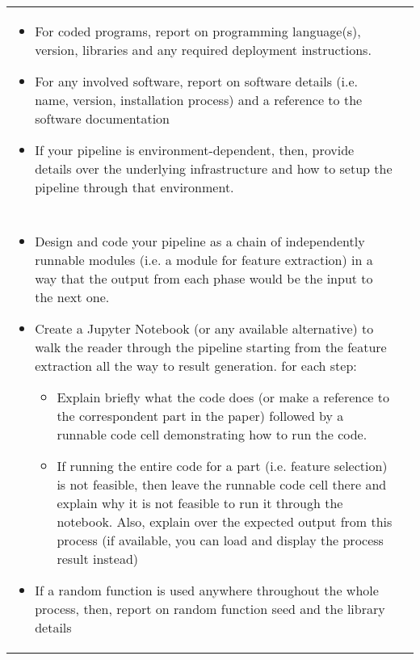 \begin{table}[ht]
    \centering
    \begin{tabular}{| P{14cm} || p{2cm} |}
        \hline
        \\
        \hline
            \begin{itemize}
                \item
                {\small For coded programs, report on programming language(s), version, libraries and any required deployment instructions.}
                \item 
                {\small For any involved software, report on software details (i.e. name, version, installation process) and a reference
                to the software documentation} 
                \item
                {\small If your pipeline is environment-dependent, then, provide details over the underlying infrastructure 
                and how to setup the pipeline through that environment.}
            \end{itemize} &\\
        \hline \hline
        \\
        \hline
            \begin{itemize}
                \item
                {\small Design and code your pipeline as a chain of independently runnable modules (i.e. a module for feature extraction) 
                in a way that the output from each phase would be the input to the next one.}
                
                \item
                {\small Create a Jupyter Notebook (or any available alternative) to walk the reader through the pipeline 
                starting from the feature extraction all the way to result generation. for each step:}
                    \begin{itemize}
                        \item
                        {\footnotesize Explain briefly what the code does (or make a reference to the correspondent part in the paper) 
                        followed by a runnable code cell demonstrating how to run the code.}
                       \item
                        {\footnotesize If running the entire code for a part (i.e. feature selection) is not feasible, then leave the runnable 
                        code cell there and explain why it is not feasible to run it through the notebook. Also, explain over the expected output 
                        from this process (if available, you can load and display the process result instead)}
                \end{itemize}
                \item
                {\small If a random function is used anywhere throughout the whole process, then, 
                report on random function seed and the library details}
                

\end{itemize}
\end{tabular}
\end{table}
